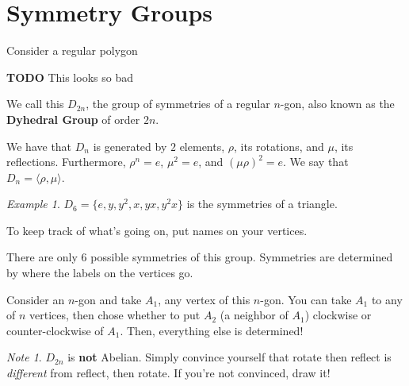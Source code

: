 \documentclass[12pt]{article}
\def\TODO{\color{red}\textbf{TODO}\color{black}}
\newcommand{\lr}[1]{\langle #1 \rangle}
\theoremstyle{remark}
\theoremstyle{remark}
\theoremstyle{remark}
\newtheorem{example}{Example}
\theoremstyle{remark}
\theoremstyle{remark}
\newtheorem*{note}{Note}
\begin{document}
\section{Symmetry Groups}

Consider a regular polygon

\begin{center}
\end{center}

\TODO{} This looks so bad

We call this $D_{2n}$, the group of symmetries of a regular $n$-gon, also known
as the {\bf Dyhedral Group} of order $2n$.

We have that $D_n$ is generated by $2$ elements, $\rho$, its rotations, and
$\mu$, its reflections. Furthermore, $\rho^n = e$, $\mu^2 = e$, and $(\mu
\rho)^2 = e$. We say that $D_n = \lr {\rho, \mu}$.

\begin{example}
  $D_6 = \{e, y, y^2, x, yx, y^2x\}$ is the symmetries of a triangle.

  \begin{center}
  \end{center}

  To keep track of what's going on, put names on your vertices.

  There are only 6 possible symmetries of this group. Symmetries are determined
  by where the labels on the vertices go.
\end{example}

Consider an $n$-gon and take $A_1$, any vertex of this $n$-gon. You can take
$A_1$ to any of $n$ vertices, then chose whether to put $A_2$ (a neighbor of
$A_1$) clockwise or counter-clockwise of $A_1$. Then, everything else is determined!

\begin{note}
  $D_{2n}$ is {\bf not} Abelian. Simply convince yourself that rotate then
  reflect is {\it different} from reflect, then rotate. If you're not convinced,
  draw it!
\end{note}
\end{document}
